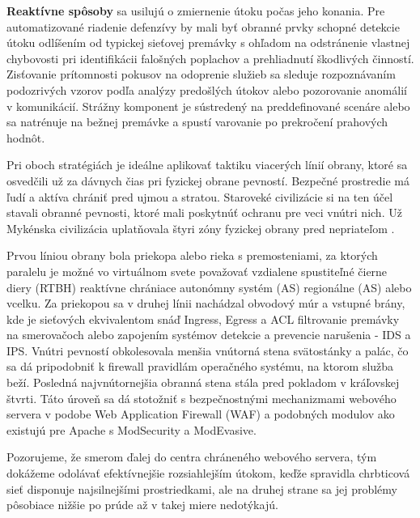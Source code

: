 \documentclass[12pt, a4paper]{article}
\begin{document}
\textbf{Reaktívne spôsoby} sa usilujú o zmiernenie útoku počas jeho konania. Pre automatizované
riadenie defenzívy by mali byť obranné prvky schopné detekcie útoku odlíšením od typickej sieťovej 
premávky s ohľadom na odstránenie vlastnej chybovosti pri identifikácii falošných poplachov
a prehliadnutí škodlivých činností. Zisťovanie prítomnosti pokusov na odoprenie služieb
sa sleduje rozpoznávaním podozrivých vzorov podľa analýzy predošlých útokov alebo
pozorovanie anomálií v komunikácií. Strážny komponent je sústredený na preddefinované scenáre alebo
sa natrénuje na bežnej premávke a spustí varovanie po prekročení prahových hodnôt.

Pri oboch stratégiách je ideálne aplikovať taktiku viacerých línií obrany, ktoré sa osvedčili už 
za dávnych  čias pri fyzickej obrane pevností. Bezpečné prostredie má ľudí a aktíva chrániť pred ujmou a 
stratou. Staroveké civilizácie si na ten účel stavali obranné pevnosti, ktoré mali poskytnúť ochranu pre 
veci vnútri nich. Už Mykénska civilizácia uplatňovala štyri zóny fyzickej obrany pred nepriateľom 
\cite{physical-security}. 

Prvou líniou obrany bola priekopa alebo rieka s premosteniami, za ktorých paralelu je možné vo virtuálnom 
svete považovať vzdialene spustiteľné čierne diery (RTBH) reaktívne chrániace autonómny systém (AS) 
regionálne (AS) alebo vcelku. Za priekopou sa v druhej línii nachádzal obvodový múr a vstupné brány, kde je 
sieťových ekvivalentom snáď Ingress, Egress a ACL filtrovanie premávky na smerovačoch alebo 
zapojením systémov detekcie a prevencie narušenia - IDS a IPS. Vnútri pevností obkolesovala menšia vnútorná 
stena svätostánky a palác, čo sa dá pripodobniť k firewall pravidlám operačného systému, na ktorom služba 
beží. Posledná najvnútornejšia obranná stena stála pred pokladom v kráľovskej štvrti. Táto úroveň sa dá 
stotožniť s bezpečnostnými mechanizmami webového servera v podobe Web Application Firewall (WAF) a podobných
modulov ako existujú pre Apache s ModSecurity a ModEvasive.

Pozorujeme, že smerom ďalej do centra chráneného webového  servera, tým dokážeme odolávať efektívnejšie 
rozsiahlejším útokom, keďže spravidla chrbticová sieť disponuje najsilnejšími prostriedkami, ale na druhej 
strane sa jej problémy pôsobiace nižšie po prúde až v takej miere nedotýkajú.
\end{document}
